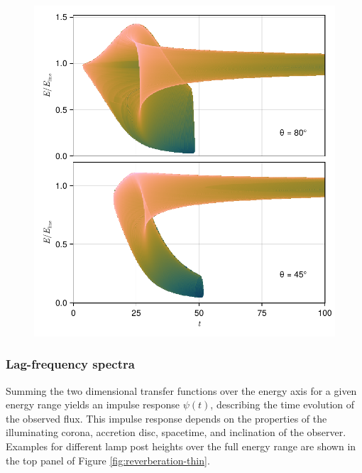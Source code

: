 \documentclass[fleqn,usenatbib]{mnras}
\begin{document}
\begin{figure}
	\centering
	\includegraphics[width=0.97\linewidth]{figures/transfer-functions.2d.pdf}
	\caption{}
	\label{fig:lag-frequency-transfer-functions}
\end{figure}

\subsubsection{Lag-frequency spectra}

Summing the two dimensional transfer functions over the energy axis for a given energy range yields an impulse response $\psi(t)$, describing the time evolution of the observed flux. This impulse response depends on the properties of the illuminating corona, accretion disc, spacetime, and inclination of the observer. Examples for different lamp post heights over the full energy range are shown in the top panel of Figure \ref{fig:reverberation-thin}.
\end{document}
